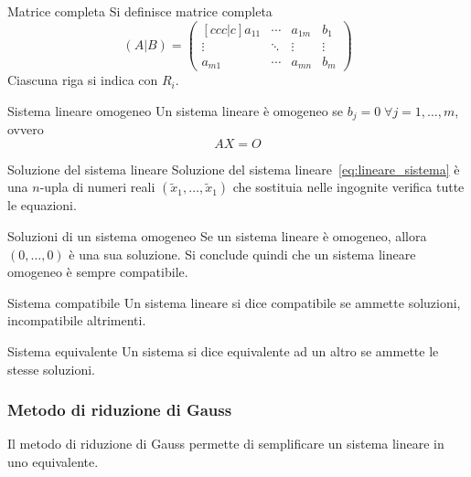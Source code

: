 \begin{Def}{Matrice completa}
  Si definisce matrice completa
  \begin{equation*}
    (A\vert B)=
    \begin{pmatrix}[ccc|c]
      a_{11} & \cdots & a_{1m} & b_1\\
      \vdots & \ddots & \vdots & \vdots\\
      a_{m1} & \cdots & a_{mn} & b_m
    \end{pmatrix}
  \end{equation*}
  Ciascuna riga si indica con $R_i$.
\end{Def}

\begin{Def}{Sistema lineare omogeneo}
  Un sistema lineare è omogeneo se $b_j=0\;\forall j=1,\ldots,m$, ovvero
  \begin{equation*}
    AX=O
  \end{equation*}
\end{Def}

\begin{Def}{Soluzione del sistema lineare}
  Soluzione del sistema lineare~\eqref{eq:lineare_sistema} è una $n$-upla di numeri
  reali $(\tilde{x}_1,\ldots,\tilde{x}_1)$ che sostituia nelle ingognite
  verifica tutte le equazioni.
\end{Def}

\begin{SubDef}{Soluzioni di un sistema omogeneo}
  Se un sistema lineare è omogeneo, allora $(0,\ldots,0)$ è una sua soluzione. Si
  conclude quindi che un sistema lineare omogeneo è sempre compatibile.
\end{SubDef}

\begin{Def}{Sistema compatibile}
  Un sistema lineare si dice compatibile se ammette soluzioni, incompatibile altrimenti.
\end{Def}

\begin{Def}{Sistema equivalente}
  Un sistema si dice equivalente ad un altro se ammette le stesse soluzioni.
\end{Def}

\subsubsection{Metodo di riduzione di Gauss}%
\label{ssub:metodo_di_riduzione_di_gauss}

Il metodo di riduzione di Gauss permette di semplificare un sistema lineare in uno
equivalente.

